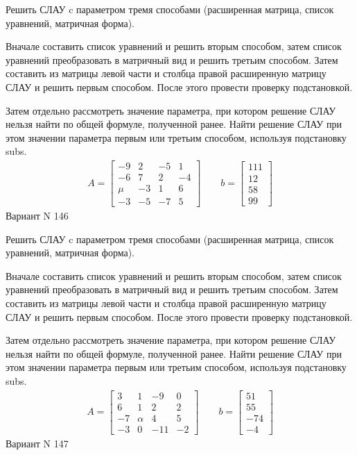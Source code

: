 \documentclass[11pt]{report}
\begin{document}
Решить СЛАУ c параметром тремя способами (расширенная матрица, список уравнений, матричная форма).

Вначале составить список уравнений и решить вторым способом,
затем список уравнений преобразовать в матричный вид и решить третьим способом.
Затем составить из матрицы левой части и столбца правой расширенную матрицу СЛАУ и решить первым способом.
После этого провести проверку подстановкой.

Затем отдельно рассмотреть значение параметра, при котором решение СЛАУ нельзя найти по общей формуле,
полученной ранее.
Найти решение СЛАУ при этом значении параметра первым или третьим способом, используя подстановку subs.
\begin{align*}
    A = \left[\begin{matrix}-9 & 2 & -5 & 1\\-6 & 7 & 2 & -4\\\mu & -3 & 1 & 6\\-3 & -5 & -7 & 5\end{matrix}\right]
\qquad b = \left[\begin{matrix}111\\12\\58\\99\end{matrix}\right]
\end{align*}
\newpage
Вариант N 146


Решить СЛАУ c параметром тремя способами (расширенная матрица, список уравнений, матричная форма).

Вначале составить список уравнений и решить вторым способом,
затем список уравнений преобразовать в матричный вид и решить третьим способом.
Затем составить из матрицы левой части и столбца правой расширенную матрицу СЛАУ и решить первым способом.
После этого провести проверку подстановкой.

Затем отдельно рассмотреть значение параметра, при котором решение СЛАУ нельзя найти по общей формуле,
полученной ранее.
Найти решение СЛАУ при этом значении параметра первым или третьим способом, используя подстановку subs.
\begin{align*}
    A = \left[\begin{matrix}3 & 1 & -9 & 0\\6 & 1 & 2 & 2\\-7 & \alpha & 4 & 5\\-3 & 0 & -11 & -2\end{matrix}\right]
\qquad b = \left[\begin{matrix}51\\55\\-74\\-4\end{matrix}\right]
\end{align*}
\newpage
Вариант N 147
\end{document}
